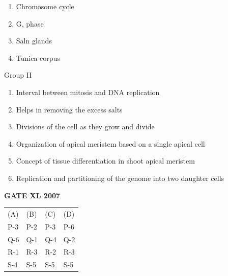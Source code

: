 \documentclass[journal,12pt,onecolumn]{IEEEtran}
\begin{document}
\begin{enumerate}
\begin{minipage}{0.5\textwidth}
\begin{flushleft}
\begin{enumerate}
	\item Chromosome cycle
        \item G, phase
        \item Saln glands
        \item Tunica-corpus
    \end{enumerate}
    \end{flushleft}
		    \end{minipage}
	    \begin{minipage}{0.5\textwidth}
		    \begin{flushleft}
		    Group II
    \begin{enumerate}
        \item Interval between mitosis and DNA replication
        \item Helps in removing the excess salts
        \item Divisions of the cell as they grow and divide
        \item Organization of apical meristem based on a single apical cell
        \item Concept of tissue differentiation in shoot apical meristem
        \item Replication and partitioning of the genome into two daughter cells
    \end{enumerate}\hfill{\textbf{GATE XL 2007}}
    \end{flushleft}
		    \end{minipage}

\begin{tabular}{l l l l}
     (A) & (B) & (C) & (D) \\
     P-3 & P-2 & P-3 & P-6 \\
     Q-6 & Q-1 & Q-4 & Q-2 \\
     R-1 & R-3 & R-2 & R-3 \\
     S-4 & S-5 & S-5 & S-5 \\
    \end{tabular}


\end{enumerate}
\end{document}
